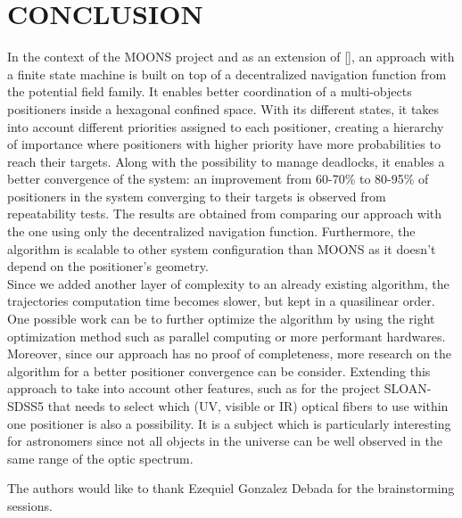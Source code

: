 \documentclass[]{spie}  %
\begin{document}
	\section{CONCLUSION}
	\label{CONCLUSION}
	In the context of the MOONS project and as an extension of [], an approach with a finite state machine is built on top of a decentralized navigation function from the potential field family. It enables better coordination of a multi-objects positioners inside a hexagonal confined space. With its different states, it takes into account different priorities assigned to each positioner, creating a hierarchy of importance where positioners with higher priority have more probabilities to reach their targets. Along with the possibility to manage deadlocks, it enables a better convergence of the system:
	 an improvement from  60-70\% to 80-95\% of positioners in the system converging to their targets is observed from repeatability tests. The results are obtained from comparing our approach with the one using only the decentralized navigation function. Furthermore, the algorithm is scalable to other system configuration than MOONS as it doesn't depend on the positioner's geometry.\\
	Since we added another layer of complexity to an already existing algorithm, the trajectories computation time becomes slower, but kept in a  quasilinear order. One possible work can be to further optimize the algorithm by using the right optimization method such as parallel computing or more performant hardwares. Moreover, since our approach has no proof of completeness, more research on the algorithm for a better positioner convergence can be consider.
	Extending this approach to take into account other features, such as for the project SLOAN-SDSS5 that needs to select which (UV, visible or IR) optical fibers to use within one positioner is also a possibility. It is a subject which is particularly interesting for astronomers since not all objects in the universe can be well observed in the same range of the optic spectrum.
	
	\acknowledgments %
	
	The authors would like to thank Ezequiel Gonzalez Debada for the brainstorming sessions.

\end{document}
